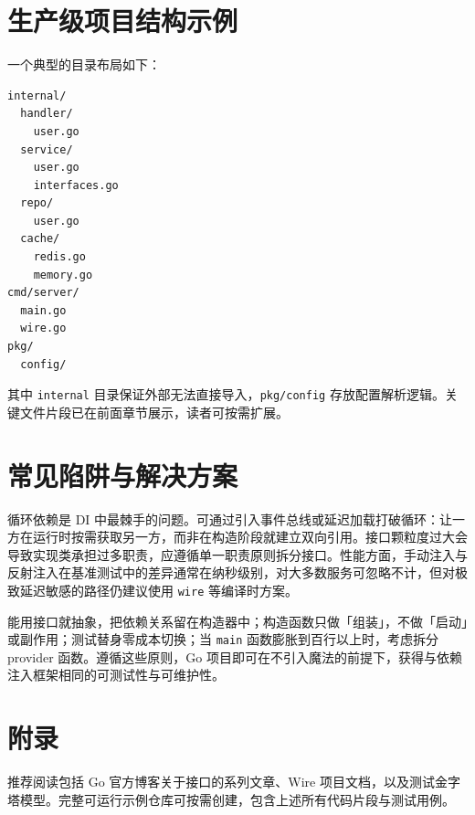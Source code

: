 \chapter{生产级项目结构示例}
一个典型的目录布局如下：\par
\begin{lstlisting}
internal/
  handler/
    user.go
  service/
    user.go
    interfaces.go
  repo/
    user.go
  cache/
    redis.go
    memory.go
cmd/server/
  main.go
  wire.go
pkg/
  config/
\end{lstlisting}
其中 \texttt{internal} 目录保证外部无法直接导入，\texttt{pkg/config} 存放配置解析逻辑。关键文件片段已在前面章节展示，读者可按需扩展。\par
\chapter{常见陷阱与解决方案}
循环依赖是 DI 中最棘手的问题。可通过引入事件总线或延迟加载打破循环：让一方在运行时按需获取另一方，而非在构造阶段就建立双向引用。接口颗粒度过大会导致实现类承担过多职责，应遵循单一职责原则拆分接口。性能方面，手动注入与反射注入在基准测试中的差异通常在纳秒级别，对大多数服务可忽略不计，但对极致延迟敏感的路径仍建议使用 \texttt{wire} 等编译时方案。\par
能用接口就抽象，把依赖关系留在构造器中；构造函数只做「组装」，不做「启动」或副作用；测试替身零成本切换；当 \texttt{main} 函数膨胀到百行以上时，考虑拆分 provider 函数。遵循这些原则，Go 项目即可在不引入魔法的前提下，获得与依赖注入框架相同的可测试性与可维护性。\par
\chapter{附录}
推荐阅读包括 Go 官方博客关于接口的系列文章、Wire 项目文档，以及测试金字塔模型。完整可运行示例仓库可按需创建，包含上述所有代码片段与测试用例。\par
